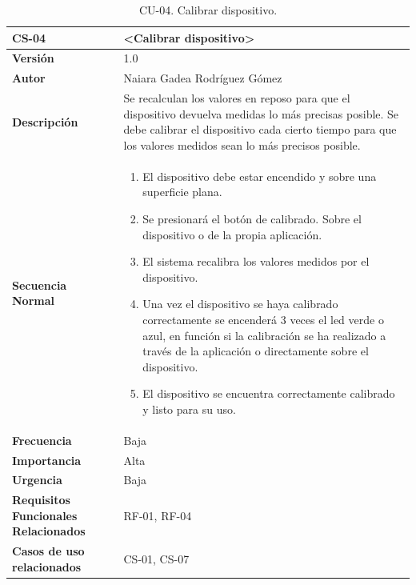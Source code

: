 \begin{table}[h!]
\centering
\begin{tabular}{ |m{3cm}|m{11cm}|  } 
\hline
\cellcolor[HTML]{B9E3F0}\textbf{CS-04} & \cellcolor[HTML]{B9E3F0}\textbf{<Calibrar dispositivo>}\\

\hline
\cellcolor[HTML]{EFEFEF}\textbf{Versión}             & 1.0  \\
\hline
\cellcolor[HTML]{EFEFEF}\textbf{Autor}                & Naiara Gadea Rodríguez Gómez\\
\hline
\cellcolor[HTML]{EFEFEF}\textbf{Descripción}                & {Se recalculan los valores en reposo para que el dispositivo devuelva medidas lo más precisas posible. Se debe calibrar el dispositivo cada cierto tiempo para que los valores medidos sean lo más precisos posible.}\\
\hline
\cellcolor[HTML]{EFEFEF}\textbf{Secuencia \newline Normal}                &                 
        \begin{enumerate}
			\def\labelenumi{\arabic{enumi}.}
			\tightlist
			\item El dispositivo debe estar encendido y sobre una superficie plana.
			\item Se presionará el botón de calibrado. Sobre el dispositivo o de la propia aplicación. 
                \item El sistema recalibra los valores medidos por el dispositivo.
                \item Una vez el dispositivo se haya calibrado correctamente se encenderá 3 veces el led verde o azul, en función si la calibración se ha realizado a través de la aplicación o directamente sobre el dispositivo. 
                \item El dispositivo se encuentra correctamente calibrado y listo para su uso. 
		\end{enumerate}\\
\hline
\cellcolor[HTML]{EFEFEF}\textbf{Frecuencia}                & Baja\\
\hline
\cellcolor[HTML]{EFEFEF}\textbf{Importancia}                & Alta\\
\hline
\cellcolor[HTML]{EFEFEF}\textbf{Urgencia}                & Baja\\
\hline
\cellcolor[HTML]{EFEFEF}\textbf{Requisitos Funcionales Relacionados}                & {RF-01, RF-04}\\
\hline
\cellcolor[HTML]{EFEFEF}\textbf{Casos de uso relacionados}                & {CS-01, CS-07}\\
\hline
\end{tabular}
\caption{CU-04. Calibrar dispositivo.}
\end{table}

